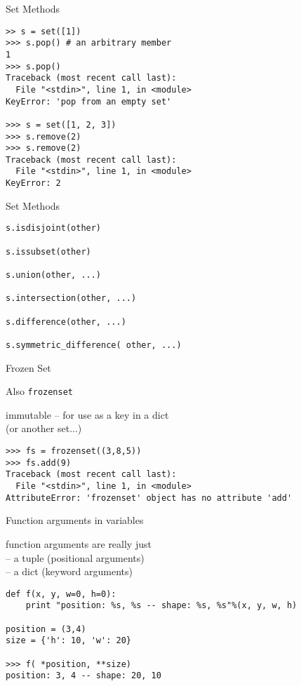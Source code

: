 \documentclass{beamer}
\begin{document}
\begin{frame}[fragile]{ Set Methods}

\begin{verbatim}
>> s = set([1])
>>> s.pop() # an arbitrary member
1
>>> s.pop()
Traceback (most recent call last):
  File "<stdin>", line 1, in <module>
KeyError: 'pop from an empty set'

>>> s = set([1, 2, 3])
>>> s.remove(2)
>>> s.remove(2)
Traceback (most recent call last):
  File "<stdin>", line 1, in <module>
KeyError: 2
\end{verbatim}

\vfill
\end{frame} 

\begin{frame}[fragile]{ Set Methods}

\begin{verbatim}
s.isdisjoint(other)

s.issubset(other)

s.union(other, ...)

s.intersection(other, ...)

s.difference(other, ...)

s.symmetric_difference( other, ...)
\end{verbatim}

\vfill
\end{frame} 

\begin{frame}[fragile]{ Frozen Set}

\vfill
{\Large Also \verb|frozenset|}

\vfill
{\Large immutable -- for use as a key in a dict\\
(or another set...)}

\vfill
\begin{verbatim}
>>> fs = frozenset((3,8,5))
>>> fs.add(9)
Traceback (most recent call last):
  File "<stdin>", line 1, in <module>
AttributeError: 'frozenset' object has no attribute 'add'
\end{verbatim}

\vfill
\end{frame} 

\begin{frame}[fragile]{Function arguments in variables}

{\Large function arguments are really just\\
 -- a tuple (positional arguments) \\
 -- a dict (keyword arguments) \\
}
\begin{verbatim}
def f(x, y, w=0, h=0):
    print "position: %s, %s -- shape: %s, %s"%(x, y, w, h)

position = (3,4)
size = {'h': 10, 'w': 20}

>>> f( *position, **size)
position: 3, 4 -- shape: 20, 10
\end{verbatim}

\end{frame} 
\end{document}
